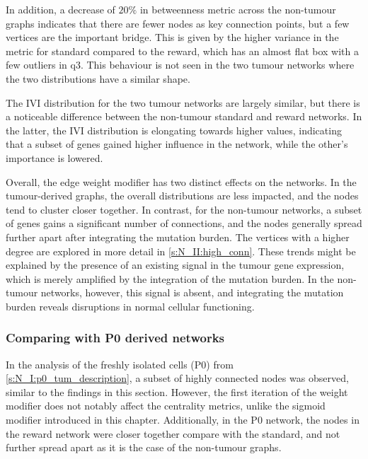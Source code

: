 In addition, a decrease of $20\%$ in betweenness metric across the non-tumour graphs indicates that there are fewer nodes as key connection points, but a few vertices are the important bridge. This is given by the higher variance in the metric for standard compared to the reward, which has an almost flat box with a few outliers in q3. This behaviour is not seen in the two tumour networks where the two distributions have a similar shape.


The IVI distribution for the two tumour networks are largely similar, but there is a noticeable difference between the non-tumour standard and reward networks. In the latter, the IVI distribution is elongating towards higher values, indicating that a subset of genes gained higher influence in the network, while the other's importance is lowered.


Overall, the edge weight modifier has two distinct effects on the networks. In the tumour-derived graphs, the overall distributions are less impacted, and the nodes tend to cluster closer together. In contrast, for the non-tumour networks, a subset of genes gains a significant number of connections, and the nodes generally spread further apart after integrating the mutation burden. The vertices with a higher degree are explored in more detail in \cref{s:N_II:high_conn}. These trends might be explained by the presence of an existing signal in the tumour gene expression, which is merely amplified by the integration of the mutation burden. In the non-tumour networks, however, this signal is absent, and integrating the mutation burden reveals disruptions in normal cellular functioning.

\subsubsection*{Comparing with P0 derived networks}

In the analysis of the freshly isolated cells (P0) from \cref{s:N_I:p0_tum_description}, a subset of highly connected nodes was observed, similar to the findings in this section. However, the first iteration of the weight modifier does not notably affect the centrality metrics, unlike the sigmoid modifier introduced in this chapter. Additionally, in the P0 network, the nodes in the reward network were closer together compare with the standard, and not further spread apart as it is the case of the non-tumour graphs.

